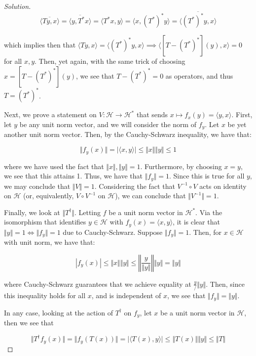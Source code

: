 \documentclass[10pt]{article}
\begin{document}
\begin{proof}[Solution]
$$ \overline{\langle Ty, x \rangle} = \overline{ \langle y, T^* x \rangle } = \langle T^* x , y \rangle = \langle x, (T^*)^* y \rangle = \overline{\langle (T^*)^* y , x \rangle }$$

which implies then that $\langle Ty, x \rangle = \langle (T^*)^* y , x \rangle \implies \langle [T - (T^*)^*](y), x \rangle = 0$ for all $x, y$. Then, yet again, with the same trick of choosing $x = [T - (T^*)^*](y)$, we see that $T - (T^*)^* = 0$ as operators, and thus $T = (T^*)^*$.

Next, we prove a statement on $V: \mathcal{H} \to \mathcal{H}^*$ that sends $x \mapsto f_x(y) = \langle y, x \rangle$. First, let $y$ be any unit norm vector, and we will consider the norm of $f_y$. Let $x$ be yet another unit norm vector. Then, by the Cauchy-Schwarz inequality, we have that:

$$ \Vert f_y(x) \Vert = | \langle x, y \rangle | \leq \Vert x \Vert \Vert y \Vert \leq 1 $$

where we have used the fact that $\Vert x \Vert, \Vert y \Vert = 1$. Furthermore, by choosing $x = y$, we see that this attains 1. Thus, we have that $\Vert f_y \Vert = 1$. Since this is true for all $y$, we may conclude that $\Vert V \Vert = 1$. Considering the fact that $V^{-1} \circ V$ acts on identity on $\mathcal{H}$ (or, equivalently, $V \circ V^{-1}$ on $\mathcal{H}$), we can conclude that $ \Vert V^{-1} \Vert =1 $.

Finally, we look at $\Vert T^\dag \Vert$.  Letting $f$ be a unit norm vector in $\mathcal{H}^*$. Via the isomorphism that identifies $y \in \mathcal{H}$ with $f_y(x) = \langle x, y \rangle$, it is clear that $\Vert y \Vert = 1 \iff \Vert f_y \Vert = 1$ due to Cauchy-Schwarz. Suppose $\Vert f_y \Vert =1$. Then, for $x \in \mathcal{H}$ with unit norm, we have that:

$$|f_y(x)| \leq \Vert x \Vert \Vert y \Vert \leq   \left\Vert \frac{y}{\Vert y \Vert} \right\Vert \Vert y \Vert = \Vert y \Vert $$

where Cauchy-Schwarz guarantees that we achieve equality at $\frac{y}/\Vert y \Vert$. Then, since this inequality holds for all $x$, and is independent of $x$, we see that $\Vert f_y \Vert = \Vert y \Vert$.

In any case, looking at the action of $T^\dag$ on $f_y$, let $x$ be a unit norm vector in $\mathcal{H}$, then we see that 

$$\Vert T^\dag f_y(x) \Vert = \Vert f_y(T(x)) \Vert = | \langle T(x), y \rangle | \leq \Vert T(x) \Vert \Vert y \Vert \leq \Vert T \Vert$$


\end{proof}
\end{document}
